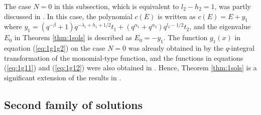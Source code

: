 \documentclass[12pt]{amsart}
\numberwithin{equation}{section}
\theoremstyle{definition}
\theoremstyle{remark}
\begin{document}
The case $N=0$ in this subsection, which is equivalent to $ l_2 -h_2 =1$, was partly discussed in \cite{TakK}.
In this case, the polynomial $c(E)$ is written as $c(E) =E +y_1 $ where $y_1 = ( q^{- \beta  } + 1 )q^{ -\lambda _1 +h_{1} +1/2 }t_{1} + ( q^{ \alpha_ 1 } + q^{\alpha _2} ) q^{l_2 - 1/2 }t_{2} $, and the eigenvalue $E_0$ in Theorem \ref{thm:1sols} is described as $E_0= -y_1 $.
The function $g_1 (x)$ in equation (\ref{eq:1g1g2}) on the case $N=0$ was already obtained in \cite[(5.3)]{TakK} by the $q$-integral transformation of the monomial-type function, and the functions in equations (\ref{eq:1g11}) and (\ref{eq:1g12}) were also obtained in \cite[p.18]{TakK}.
Hence, Theorem \ref{thm:1sols} is a significant extension of the results in \cite[p.18]{TakK}.

\subsection{Second family of solutions} \label{sec:2sol}
\end{document}
